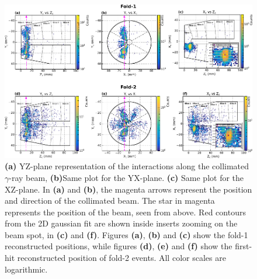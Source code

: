 \begin{figure}[htb]
\includegraphics[width=\textwidth]{images/superimposed_D10,0_-9,0_fold2_HitIndex1_AND_fold1_3subplots_with_fit.pdf}
     \caption{\textbf{(a)} YZ-plane representation of the interactions along the collimated $\gamma$-ray beam, \textbf{(b)}Same plot for the YX-plane. \textbf{(c)} Same plot for the XZ-plane. In \textbf{(a)} and \textbf{(b)}, the magenta arrows represent the position and direction of the collimated beam. The star in magenta represents the position of the beam, seen from above. Red contours from the 2D gaussian fit are shown inside inserts zooming on the beam spot, in \textbf{(c)} and \textbf{(f)}. Figures \textbf{(a)}, \textbf{(b)} and \textbf{(c)} show the fold-1 reconstructed positions, while figures \textbf{(d)}, \textbf{(e)} and \textbf{(f)} show the first-hit reconstructed position of fold-2 events. All color scales are logarithmic.}
\label{fig:H_beam_10.0_-9.0_fold2_HitIndex1_and_fold1}       %
\end{figure}


